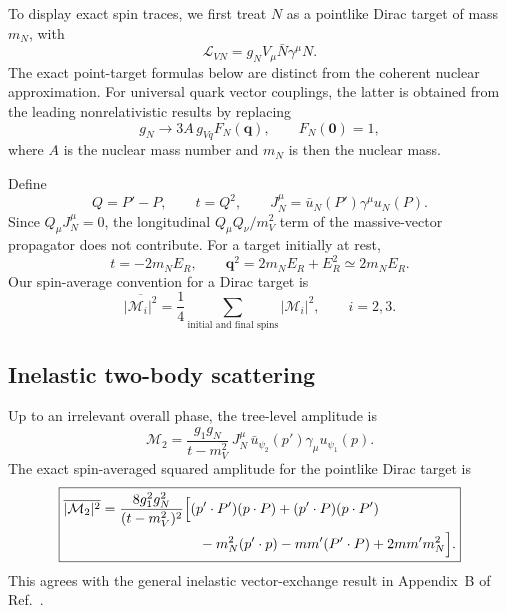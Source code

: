 \documentclass[prd,showpacs,preprintnumbers,amsmath,amssymb,twocolumn,
superscriptaddress,notitlepage]{revtex4-2}
\newcommand{\Msq}[1]{\overline{|\mathcal{M}_{#1}|^2}}
\newcommand{\qvec}{\boldsymbol{q}}
\begin{document}
To display exact spin traces, we first treat $N$ as a pointlike Dirac
target of mass $m_N$, with
\begin{equation}
\mathcal{L}_{VN}=g_NV_\mu\bar N\gamma^\mu N.
\end{equation}
The exact point-target formulas below are distinct from the coherent
nuclear approximation. For universal quark vector couplings, the latter
is obtained from the leading nonrelativistic results by replacing
\begin{equation}
g_N\longrightarrow 3A\,g_{Vq}F_N(\qvec),\qquad
F_N(\boldsymbol{0})=1,
\label{eq:nuclear}
\end{equation}
where $A$ is the nuclear mass number and $m_N$ is then the nuclear mass.

Define
\begin{equation}
Q=P'-P,\qquad t=Q^2,\qquad
J_N^\mu=\bar u_N(P')\gamma^\mu u_N(P).
\end{equation}
Since $Q_\mu J_N^\mu=0$, the longitudinal $Q_\mu Q_\nu/m_V^2$ term
of the massive-vector propagator does not contribute.
For a target initially at rest,
\begin{equation}
t=-2m_NE_R,\qquad
\qvec^2=2m_NE_R+E_R^2\simeq2m_NE_R.
\end{equation}
Our spin-average convention for a Dirac target is
\begin{equation}
\Msq{i}=\frac14
\sum_{\text{initial and final spins}}|\mathcal{M}_i|^2,\qquad i=2,3.
\end{equation}

\subsection{Inelastic two-body scattering}

Up to an irrelevant overall phase, the tree-level amplitude is
\begin{equation}
\boxed{
\mathcal{M}_2=
\frac{g_1g_N}{t-m_V^2}\,
J_N^\mu\,\bar u_{\psi_2}(p')\gamma_\mu u_{\psi_1}(p).
}
\label{eq:amp-two}
\end{equation}
The exact spin-averaged squared amplitude for the pointlike Dirac target is
\begin{equation}
\boxed{\begin{aligned}
\Msq{2}
={}&\frac{8g_1^2g_N^2}{(t-m_V^2)^2}
\Big[
(p'\cdot P')(p\cdot P)+(p'\cdot P)(p\cdot P')\\
&\hspace{20mm}
-m_N^2(p'\cdot p)-mm'(P'\cdot P)+2mm'm_N^2
\Big].
\end{aligned}}
\label{eq:msq-two-exact}
\end{equation}
This agrees with the general inelastic vector-exchange result in
Appendix~B of Ref.~\cite{Kahn:2014sra}.
\end{document}
